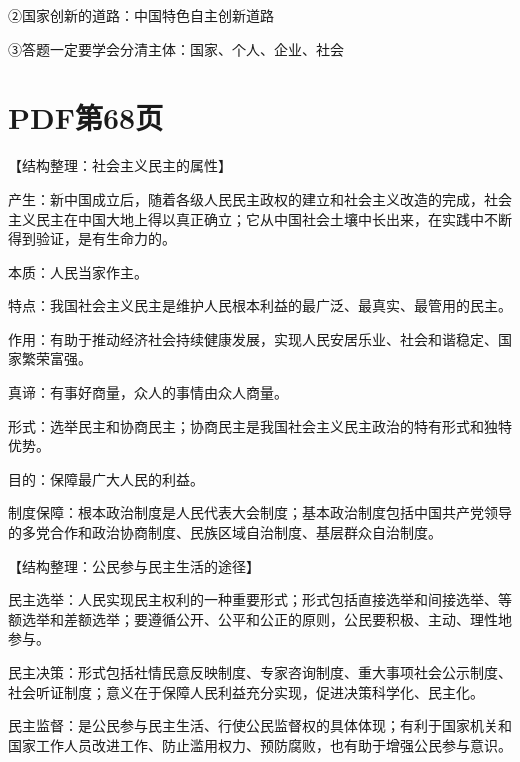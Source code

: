 \documentclass[lang=cn,11pt]{elegantbook}
\newcommand{\daofasym}[1]{{\daofasymbolfont #1}}
\newcommand{\daofasym}[1]{#1}
\begin{document}
\daofasym{②}国家创新的道路：中国特色自主创新道路\par

\daofasym{③}答题一定要学会分清主体：国家、个人、企业、社会\par


\section*{PDF第68页}

【结构整理：社会主义民主的属性】\par

产生：新中国成立后，随着各级人民民主政权的建立和社会主义改造的完成，社会主义民主在中国大地上得以真正确立；它从中国社会土壤中长出来，在实践中不断得到验证，是有生命力的。\par

本质：人民当家作主。\par

特点：我国社会主义民主是维护人民根本利益的最广泛、最真实、最管用的民主。\par

作用：有助于推动经济社会持续健康发展，实现人民安居乐业、社会和谐稳定、国家繁荣富强。\par

真谛：有事好商量，众人的事情由众人商量。\par

形式：选举民主和协商民主；协商民主是我国社会主义民主政治的特有形式和独特优势。\par

目的：保障最广大人民的利益。\par

制度保障：根本政治制度是人民代表大会制度；基本政治制度包括中国共产党领导的多党合作和政治协商制度、民族区域自治制度、基层群众自治制度。\par

【结构整理：公民参与民主生活的途径】\par

民主选举：人民实现民主权利的一种重要形式；形式包括直接选举和间接选举、等额选举和差额选举；要遵循公开、公平和公正的原则，公民要积极、主动、理性地参与。\par

民主决策：形式包括社情民意反映制度、专家咨询制度、重大事项社会公示制度、社会听证制度；意义在于保障人民利益充分实现，促进决策科学化、民主化。\par

民主监督：是公民参与民主生活、行使公民监督权的具体体现；有利于国家机关和国家工作人员改进工作、防止滥用权力、预防腐败，也有助于增强公民参与意识。\par
\end{document}
